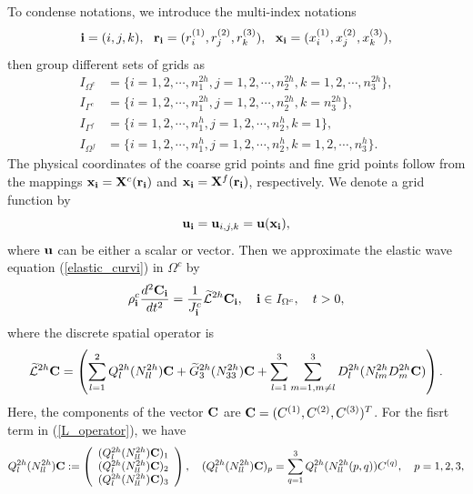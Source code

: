  To condense notations, we introduce the multi-index notations
\[{\bf i} = (i,j,k),\ \ {\bf r}_{\bf i} = (r^{(1)}_i,r^{(2)}_j,r^{(3)}_k),\ \ {\bf x}_{\bf i} = (x^{(1)}_i,x^{(2)}_j,x^{(3)}_k),\]
then group different sets of grids as
\begin{equation*}
\begin{aligned}
	I_{\Omega^c} &= \{i = 1,2,\cdots,n_1^{2h}, j = 1,2,\cdots,n_2^{2h}, k = 1,2,\cdots,n_3^{2h}\},\\
	I_{\Gamma^c} & = \{i = 1,2,\cdots,n_1^{2h}, j = 1,2,\cdots,n_2^{2h}, k = n_3^{2h}\},\\
	I_{\Gamma^f} & = \{i = 1,2,\cdots,n_1^{h}, j = 1,2,\cdots,n_2^{h}, k = 1\},\\
	I_{\Omega^f} &= \{i = 1,2,\cdots,n_1^h, j = 1,2,\cdots,n_2^h, k = 1,2,\cdots,n_3^h\}.
\end{aligned}	
\end{equation*}
The physical coordinates of the coarse grid points and fine grid points follow from the mappings ${\bf x}_{\bf i} = {\bf X}^c({\bf r}_{\bf i})$ and ${\bf x}_{\bf i} = {\bf X}^f({\bf r}_{\bf i})$, respectively. We denote a grid function by
\[{\bf u}_{\bf i} = {\bf u}_{i,j,k} = {\bf u}({\bf x}_{\bf i}),\]
where ${\bf u}$ can be either a scalar or vector. Then we approximate the elastic wave equation (\ref{elastic_curvi}) in $\Omega^c$ by
\begin{equation}\label{elastic_semi_c}
{\rho}_{\bf i}^{c}\frac{d^2{{\bf C}_{\bf i}}}{dt^2} = \frac{1}{J^c_{\bf i}}\wt{\mathcal{L}}^{2h} {{\bf C}}_{\bf i},\quad {\bf i}\in I_{\Omega^c},\quad t>0,
\end{equation}
where the discrete spatial operator is
\begin{equation}\label{L_operator}
\wt{\mathcal{L}}^{2h} {{\bf C}} = \left(\sum_{l=1}^2{Q}_l^{2h}({N}_{ll}^{2h}){\bf C}+\wt{{G}}_3^{2h}({N}_{33}^{2h}){{\bf C}}+\sum_{l=1}^3\sum_{m=1,m\neq l}^3{D}_l^{2h}({N}_{lm}^{2h}{D}_m^{2h}{\bf C})\right).
\end{equation}
Here, the components of the vector ${\bf C}$ are ${\bf C} = (C^{(1)}, C^{(2)}, C^{(3)})^T$. For the fisrt term in (\ref{L_operator}), we have
\begin{align*}
{Q}_l^{2h}({N}_{ll}^{2h}){\bf C} := \left(\begin{array}{c}
({Q}_l^{2h}({N}_{ll}^{2h}){\bf C})_1 \\
({Q}_l^{2h}({N}_{ll}^{2h}){\bf C})_2 \\
({Q}_l^{2h}({N}_{ll}^{2h}){\bf C})_3 
\end{array}\right), \quad ({Q}_l^{2h}({N}_{ll}^{2h}){\bf C})_p = \sum_{q = 1}^{3} Q_l^{2h}(N_{ll}^{2h}(p,q)) {C}^{(q)},\quad p = 1,2,3,
\end{align*}
